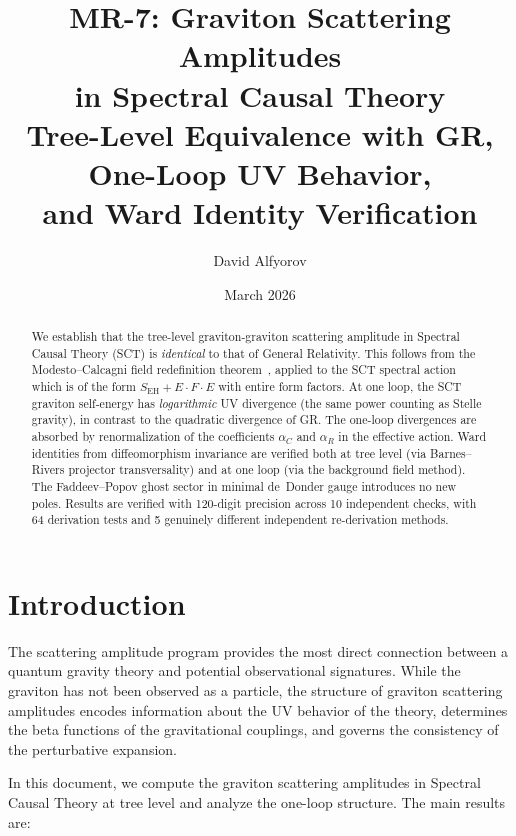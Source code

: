 \documentclass[11pt,a4paper]{article}
\title{\textbf{MR-7: Graviton Scattering Amplitudes\\[4pt]
       in Spectral Causal Theory}\\[10pt]
  \large Tree-Level Equivalence with GR, One-Loop UV Behavior,\\
  and Ward Identity Verification}
\author{David Alfyorov}
\date{March 2026}
\theoremstyle{definition}
\theoremstyle{remark}
\begin{document}
\maketitle

\begin{abstract}
We establish that the tree-level graviton-graviton scattering amplitude in
Spectral Causal Theory (SCT) is \emph{identical} to that of General
Relativity. This follows from the Modesto--Calcagni field redefinition
theorem~\cite{ModestoCalcagni2021}, applied to the SCT spectral action
which is of the form $S_{\mathrm{EH}} + E \cdot F \cdot E$ with entire
form factors. At one loop, the SCT graviton self-energy has
\emph{logarithmic} UV divergence (the same power counting as Stelle
gravity), in contrast to the quadratic divergence of GR. The one-loop
divergences are absorbed by renormalization of the coefficients $\alpha_C$
and $\alpha_R$ in the effective action. Ward identities from diffeomorphism
invariance are verified both at tree level (via Barnes--Rivers projector
transversality) and at one loop (via the background field method). The
Faddeev--Popov ghost sector in minimal de~Donder gauge introduces no new
poles. Results are verified with 120-digit precision across 10 independent
checks, with 64 derivation tests and 5 genuinely different independent
re-derivation methods.
\end{abstract}

\tableofcontents

\section{Introduction}
\label{sec:intro}

The scattering amplitude program provides the most direct connection
between a quantum gravity theory and potential observational signatures.
While the graviton has not been observed as a particle, the structure of
graviton scattering amplitudes encodes information about the UV behavior
of the theory, determines the beta functions of the gravitational couplings,
and governs the consistency of the perturbative expansion.

In this document, we compute the graviton scattering amplitudes in
Spectral Causal Theory at tree level and analyze the one-loop structure.
The main results are:
\end{document}
